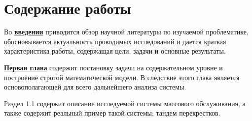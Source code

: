 \documentclass[14pt]{extarticle}
\theoremstyle{theorem}
\theoremstyle{remark}
\begin{document}






\section*{Содержание работы}
Во \underline{\textbf{введении}} приводится обзор научной литературы по изучаемой проблематике, обосновывается актуальность проводимых исследований и дается краткая характеристика работы, содержащая цели, задачи и основные результаты.

\underline{\textbf{Первая глава}} содержит постановку задачи на содержательном уровне и построение строгой математической модели. В следствие этого глава является основополагающей для всего дальнейшего анализа системы.

Раздел 1.1 содержит описание исследуемой системы массового обслуживания, а также содержит реальный пример такой системы: тандем перекрестков.
\end{document}
